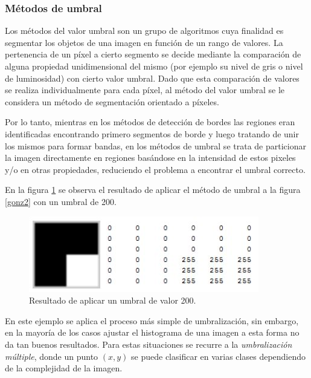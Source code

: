 \subsubsection{Métodos de umbral} %
\label{umbralSec}

Los métodos del valor umbral son un grupo de algoritmos cuya finalidad es segmentar los objetos de una imagen en función de un rango de valores. La pertenencia de un píxel a cierto segmento se decide mediante la comparación de alguna propiedad unidimensional del mismo (por ejemplo su nivel de gris o nivel de luminosidad) con cierto valor umbral. Dado que esta comparación de valores se realiza individualmente para cada píxel, al método del valor umbral se le considera un método de segmentación orientado a píxeles.

Por lo tanto, mientras en los métodos de detección de bordes las regiones eran identificadas encontrando primero segmentos de borde y luego tratando de unir los mismos para formar bandas, en los métodos de umbral se trata de particionar la imagen directamente en regiones basándose en la intensidad de estos pixeles y/o en otras propiedades, reduciendo el problema a encontrar el umbral correcto.

En la figura \ref{gonz3} se observa el resultado de aplicar el método de umbral a la figura \ref{gonz2} con un umbral de 200.

\begin{figure}[H]
\begin{center}
\includegraphics[scale=0.8]{img/03_escala_grises_umbral.jpg}
\end{center}
\caption{Resultado de aplicar un umbral de valor 200.}
\label{gonz3}
\end{figure}


En este ejemplo se aplica el proceso más simple de umbralización, sin embargo, en la mayoría de los casos ajustar el histograma de una imagen a esta forma no da tan buenos resultados. Para estas situaciones se recurre a la \textit{umbralización múltiple}, donde un punto $(x,y)$ se puede clasificar en varias clases dependiendo de la complejidad de la imagen.

